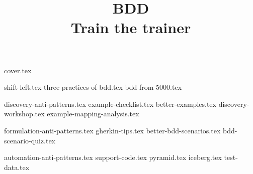 \documentclass[a4paper,12pt]{report}
\title{BDD\\Train the trainer}
\begin{document}
{cover.tex}

{shift-left.tex}
{three-practices-of-bdd.tex}
{bdd-from-5000.tex}


{discovery-anti-patterns.tex}
{example-checklist.tex}
{better-examples.tex}
{discovery-workshop.tex}
{example-mapping-analysis.tex}


{formulation-anti-patterns.tex}
{gherkin-tips.tex}
{better-bdd-scenarios.tex}
{bdd-scenario-quiz.tex}


{automation-anti-patterns.tex}
{support-code.tex}
{pyramid.tex}
{iceberg.tex}
{test-data.tex}

\end{document}
